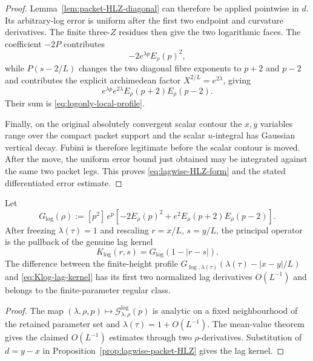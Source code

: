 \begin{proof}
Lemma~\ref{lem:packet-HLZ-diagonal} can therefore be applied pointwise in $d$.
Its arbitrary-log error is uniform after the first two endpoint and curvature
derivatives.  The finite three-$Z$ residues then give the two logarithmic
faces.  The coefficient $-2P$ contributes
\[
-2e^{\lambda p}E_\rho(p)^2,
\]
while $P(s-2/L)$ changes the two diagonal fibre exponents to $p+2$ and $p-2$
and contributes the explicit archimedean factor
$X^{2/L}=e^{2\lambda}$, giving
\[
e^{\lambda p}e^{2\lambda}E_\rho(p+2)E_\rho(p-2).
\]
Their sum is \eqref{eq:logonly-local-profile}.

Finally, on the original absolutely convergent scalar contour the $x,y$
variables range over the compact packet support and the scalar $u$-integral has
Gaussian vertical decay.  Fubini is therefore legitimate before the scalar
contour is moved.  After the move, the uniform error bound just obtained may be
integrated against the same two packet legs.  This proves
\eqref{eq:lagwise-HLZ-form} and the stated differentiated error estimate.
\end{proof}

\begin{corollary}
\label{cor:frozen-logonly-lag-kernel}
Let
\begin{equation}
\boxed{
G_{\log}(\rho):=[p^2]\,
 e^p\left[
 -2E_\rho(p)^2+e^2E_\rho(p+2)E_\rho(p-2)
 \right].
}
\label{eq:Glog-from-source}
\end{equation}
After freezing $\lambda(\tau)=1$ and rescaling $r=x/L$, $s=y/L$, the principal
operator is the pullback of the genuine lag kernel
\begin{equation}
\boxed{
K_{\log}(r,s)=G_{\log}(1-|r-s|).
}
\label{eq:Klog-lag-kernel}
\end{equation}
The difference between the finite-height profile
$G_{\log,\lambda(\tau)}(\lambda(\tau)-|x-y|/L)$ and
\eqref{eq:Klog-lag-kernel} has its first two normalized lag derivatives
$O(L^{-1})$ and belongs to the finite-parameter regular class.
\end{corollary}

\begin{proof}
The map $(\lambda,\rho,p)\mapsto\mathcal G^{\log}_{\lambda,\rho}(p)$ is analytic
on a fixed neighbourhood of the retained parameter set and
$\lambda(\tau)=1+O(L^{-1})$.  The mean-value theorem gives the claimed
$O(L^{-1})$ estimates through two $\rho$-derivatives.  Substitution of
$d=y-x$ in Proposition~\ref{prop:lagwise-packet-HLZ} gives the lag kernel.
\end{proof}

